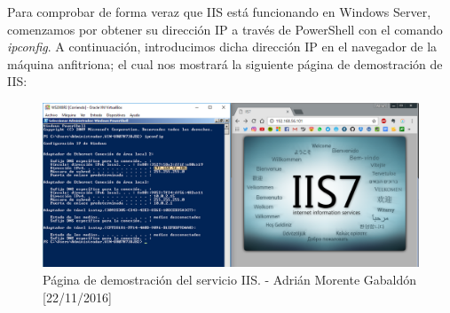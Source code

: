 Para comprobar de forma veraz que IIS está funcionando en Windows Server, comenzamos por obtener su dirección IP a través de PowerShell con el comando \emph{ipconfig}. A continuación, introducimos dicha dirección IP en el navegador de la máquina anfitriona; el cual nos mostrará la siguiente página de demostración de IIS:
\begin{figure}[H]
	\centering
	\includegraphics[scale=0.47]{iis-windows}
	\caption{Página de demostración del servicio IIS. - Adrián Morente Gabaldón [22/11/2016]}
	\label{fig:figura10}
\end{figure}


